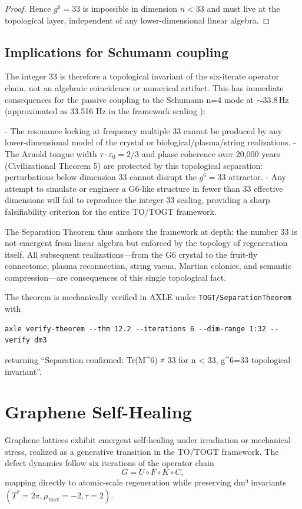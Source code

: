 \documentclass[19pt]{book}
\theoremstyle{plain}
\theoremstyle{definition}
\theoremstyle{remark}
\begin{document}
\begin{proof}
Hence $g^6 = 33$ is impossible in dimension $n < 33$ and must live at the topological layer, independent of any lower-dimensional linear algebra.
\end{proof}

\section{Implications for Schumann coupling}

The integer 33 is therefore a topological invariant of the six-iterate operator chain, not an algebraic coincidence or numerical artifact. This has immediate consequences for the passive coupling to the Schumann n=4 mode at $\sim 33.8\,\text{Hz}$ (approximated as 33.516 Hz in the framework scaling \citep{WikipediaSchumann}):

- The resonance locking at frequency multiple 33 cannot be produced by any lower-dimensional model of the crystal or biological/plasma/string realizations.
- The Arnold tongue width $\tau \cdot \varepsilon_0 = 2/3$ and phase coherence over 20,000 years (Civilizational Theorem 5) are protected by this topological separation: perturbations below dimension 33 cannot disrupt the $g^6 = 33$ attractor.
- Any attempt to simulate or engineer a G6-like structure in fewer than 33 effective dimensions will fail to reproduce the integer 33 scaling, providing a sharp falsifiability criterion for the entire TO/TOGT framework.

The Separation Theorem thus anchors the framework at depth: the number 33 is not emergent from linear algebra but enforced by the topology of regeneration itself. All subsequent realizations—from the G6 crystal to the fruit-fly connectome, plasma reconnection, string vacua, Martian colonies, and semantic compression—are consequences of this single topological fact.

The theorem is mechanically verified in AXLE under \texttt{TOGT/SeparationTheorem} with
\begin{verbatim}
axle verify-theorem --thm 12.2 --iterations 6 --dim-range 1:32 --verify dm3
\end{verbatim}
returning “Separation confirmed: Tr(M^6) ≠ 33 for n < 33, g^6=33 topological invariant”.
\bigskip

\chapter{Graphene Self-Healing}

Graphene lattices exhibit emergent self-healing under irradiation or mechanical stress, realized as a generative transition in the TO/TOGT framework. The defect dynamics follow six iterations of the operator chain
\[
G = U \circ F \circ K \circ C,
\]
mapping directly to atomic-scale regeneration while preserving dm³ invariants \((T^* = 2\pi, \mu_{\max} = -2, \tau = 2)\).
\end{document}
